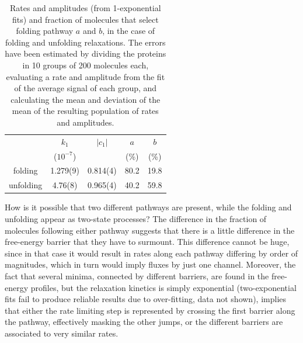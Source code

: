\begin{table}
\centering
\begin{tabular}{c|cc|cc}
\hline
\hline
& $k_1$ & $\vert c_1 \vert$ & $a$ & $b$ \\
& ($10^{-7}$)&  &(\%) & (\%) \\
\hline
folding  & 1.279(9)& 0.814(4) & 80.2 & 19.8 \\
unfolding& 4.76(8) & 0.965(4)&  40.2 & 59.8 \\
\hline
\hline
\end{tabular}
\caption{\label{tab:wild-type} 
 Rates and amplitudes (from 1-exponential fits)  and fraction of molecules that
select folding
pathway $a$ and $b$, in the case of folding and unfolding relaxations. The
errors have been estimated by dividing the proteins in 10 groups of 200
molecules each, evaluating a rate and amplitude from the fit of the average
signal of each group, and calculating the mean and deviation of the mean of the
resulting population of rates and amplitudes.}
\end{table}
How is it possible that two different pathways are present, while the folding
and unfolding appear as two-state processes? The difference in the fraction of
molecules following either pathway suggests that there is a little  difference
in the free-energy barrier that they have to surmount. This difference cannot be
huge, since in that case it would result in rates along each pathway differing
by order of magnitudes, which in turn would imply fluxes by just one channel.
Moreover, the fact that several minima, connected by different barriers, are
found in the free-energy profiles, but the relaxation kinetics is simply
exponential (two-exponential fits fail to produce reliable results due to
over-fitting, data not shown), implies that either the rate limiting step is
represented by crossing the first barrier along the pathway, effectively masking
the other jumps, or the different barriers are associated to very similar rates.

